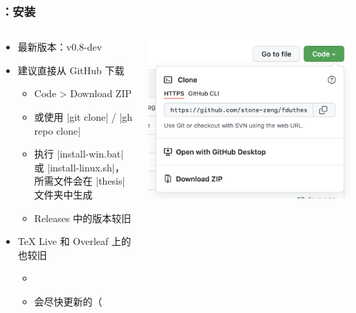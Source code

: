 \begin{frame}[fragile]
\frametitle{：安装}
\begin{columns}
\begin{column}{0.7\textwidth}
  \begin{itemize}
    \item<+-> 最新版本：v0.8-dev
    \item<+-> 建议直接从 GitHub 下载 

      \begin{itemize}
        \item Code > Download ZIP
        \item 或使用 |git clone| / |gh repo clone|
        \item 执行 |install-win.bat| 或 |install-linux.sh|，所需文件会在 |thesis| 文件夹中生成
        \item Releases 中的版本较旧
      \end{itemize}

    \item<+-> \TeX{} Live 和 Overleaf
      上的也较旧

      \begin{itemize}
        \item {}
        \item 会尽快更新的（
      \end{itemize}
  \end{itemize}
\end{column}
\begin{column}{0.26\textwidth}
  \includegraphics[width=\textwidth]{images/github-download.png}
\end{column}
\end{columns}
\end{frame}

